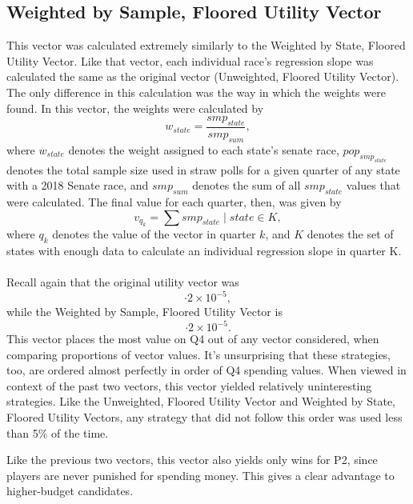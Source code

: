 \documentclass[11pt]{article}
\begin{document}
\subsection{Weighted by Sample, Floored Utility Vector}
This vector was calculated extremely similarly to the Weighted by State, Floored Utility Vector. Like that vector, each individual race's regression slope was calculated the same as the original vector (Unweighted, Floored Utility Vector). The only difference in this calculation was the way in which the weights were found. In this vector, the weights were calculated by 
\begin{equation}
w_{state} = \frac{smp_{state}}{smp_{sum}},
\end{equation}
where $w_{state}$ denotes the weight assigned to each state's senate race, $pop_{smp_{state}}$ denotes the total sample size used in straw polls for a given quarter of any state with a 2018 Senate race, and $smp_{sum}$ denotes the sum of all $smp_{state}$ values that were calculated. The final value for each quarter, then, was given by 
\begin{equation}
v_{q_k} = \sum smp_{state} \mid state \in K,
\end{equation}
where $q_k$ denotes the value of the vector in quarter $k$, and $K$ denotes the set of states with enough data to calculate an individual regression slope in quarter K.\\
\\Recall again that the original utility vector was
\begin{equation}
[ 0.611974882, 0.214168992, 0.234584564, 2.111203038 ]\cdot 2\times 10^{-5},
\end{equation}
while the Weighted by Sample, Floored Utility Vector is
\begin{equation}
[ 0.167306442, 0.089473901, 0.11420262, 2.841187593 ]\cdot 2\times 10^{-5}.
\end{equation}
This vector places the most value on Q4 out of any vector considered, when comparing proportions of vector values. It's unsurprising that these strategies, too, are ordered almost perfectly in order of Q4 spending values. When viewed in context of the past two vectors, this vector yielded relatively uninteresting strategies. Like the Unweighted, Floored Utility Vector and Weighted by State, Floored Utility Vectors, any strategy that did not follow this order was used less than 5\% of the time. 

Like the previous two vectors, this vector also yields only wins for P2, since players are never punished for spending money. This gives a clear advantage to higher-budget candidates.
\end{document}
